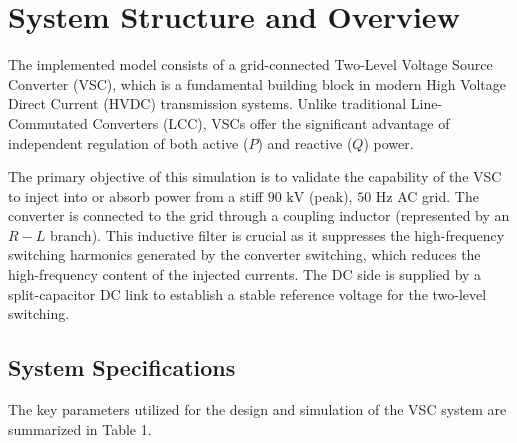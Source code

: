 \documentclass[12pt, a4paper]{article}
\begin{document}
\newpage
\newpage

\begin{abstract}
	This report presents the mathematical modeling and simulation of a grid-connected Two-Level Voltage Source Converter (VSC). The system utilizes a Hysteresis Current Controller operating in the $abc$ reference frame to achieve decoupled, independent regulation of active and reactive power. The dynamic performance and stability of the VSC are evaluated across five distinct operational scenarios, including pure active power injection, symmetrical power delivery, STATCOM operation, power reversal (rectification), and a severe transient step change. The results show reference tracking in all five cases, with the power reversal completed within a fraction of an AC cycle.
\end{abstract}

\newpage
\tableofcontents
\newpage

\section{System Structure and Overview}
The implemented model consists of a grid-connected Two-Level Voltage Source Converter (VSC), which is a fundamental building block in modern High Voltage Direct Current (HVDC) transmission systems. Unlike traditional Line-Commutated Converters (LCC), VSCs offer the significant advantage of independent regulation of both active ($P$) and reactive ($Q$) power. 

The primary objective of this simulation is to validate the capability of the VSC to inject into or absorb power from a stiff $90\text{ kV}$ (peak), $50\text{ Hz}$ AC grid. The converter is connected to the grid through a coupling inductor (represented by an $R-L$ branch). This inductive filter is crucial as it suppresses the high-frequency switching harmonics generated by the converter switching, which reduces the high-frequency content of the injected currents. The DC side is supplied by a split-capacitor DC link to establish a stable reference voltage for the two-level switching.
\subsection{System Specifications}
The key parameters utilized for the design and simulation of the VSC system are summarized in Table 1.
\end{document}
